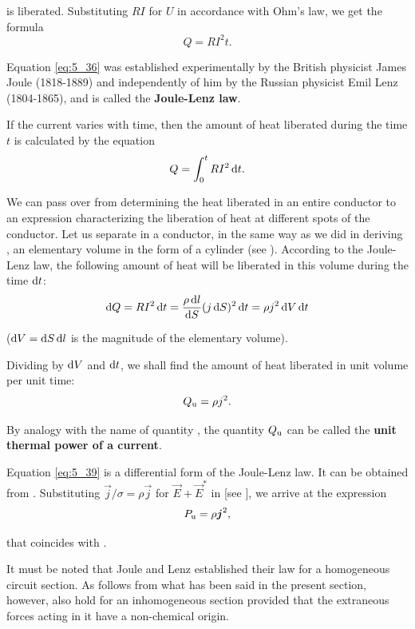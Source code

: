 \noindent
is liberated. Substituting $RI$ for $U$ in accordance with Ohm's law, we get the formula
\vspace{-12pt}
\begin{equation}\label{eq:5_36}
    Q = R I^2 t.
\end{equation}

Equation \eqref{eq:5_36} was established experimentally by the British physicist James Joule (1818-1889) and independently of him by the Russian physicist Emil Lenz (1804-1865), and is called the \textbf{Joule-Lenz law}.

If the current varies with time, then the amount of heat liberated during the time $t$ is calculated by the equation
\begin{equation}\label{eq:5_37}
    Q = \int_0^t R I^2\, \mathrm{d} t.
\end{equation}

We can pass over from  determining the heat liberated in an entire conductor to an expression characterizing the liberation of heat at different spots of the conductor. Let us separate in a conductor, in the same way as we did in deriving , an elementary volume in the form of a cylinder (see ). According to the Joule-Lenz law, the following amount of heat will be liberated in this volume during the time $\mathrm{d} t$:
\begin{equation}\label{eq:5_38}
    \mathrm{d} Q = R I^2\, \mathrm{d} t = \frac{\rho\, \mathrm{d} l}{\mathrm{d} S} (j\, \mathrm{d} S)^2\, \mathrm{d} t = \rho j^2\, \mathrm{d} V\, \mathrm{d} t
\end{equation}

\noindent
($\mathrm{d} V=\mathrm{d} S\, \mathrm{d} l$ is the magnitude of the elementary volume).

Dividing  by $\mathrm{d} V$ and $\mathrm{d} t$, we shall find the amount of heat liberated in unit volume per unit time:
\begin{equation}\label{eq:5_39}
    Q_{\text{u}} = \rho j^2.
\end{equation}

\noindent
By analogy with the name of quantity , the quantity $Q_{\text{u}}$ can be called the \textbf{unit thermal power of a current}.

Equation \eqref{eq:5_39} is a differential form of the Joule-Lenz law. It can be obtained from . Substituting $\vec{j}/\sigma= \rho\vec{j}$ for $\vec{E}+\vec{E}^*$ in  [see ], we arrive at the expression
\begin{equation*}
    P_{\text{u}} = \rho \boldsymbol{j}^2,
\end{equation*}

\noindent
that coincides with .

It must be noted that Joule and Lenz established their law for a homogeneous circuit section. As follows from what has been said in the present section, however,  also hold for an inhomogeneous section provided that the extraneous forces acting in it have a non-chemical origin.
